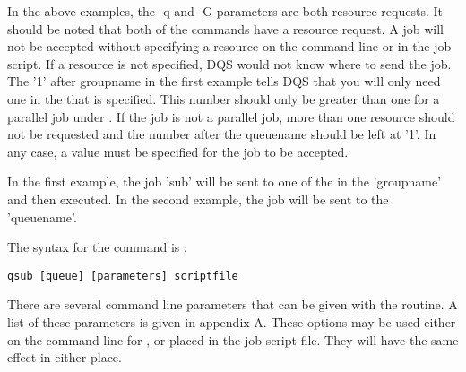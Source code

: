 In the above examples, the -q and -G parameters are both resource
requests.  It should be noted that both of the \qsub commands have a
resource request.  A job will not be accepted without specifying a resource
on the command line or in the job script.  If a resource is not specified,
DQS would not
know where to send the job.
The '1' after groupname in the first
example tells DQS that you will only need one \queue
in the \group that is specified.  This number should only be
greater than one for a parallel job under \pvm.  If the job is not a
parallel job, more than one resource should not be requested and the
number after the queuename should be left at '1'.  In any case, a value
must be specified for the job to be accepted.

In the first \qsub example, the job 'sub' will be sent to one of the
\queues in the \group 'groupname' and then executed.  In the second \qsub
example, the job will be sent to the \queue 'queuename'.

The syntax for the \qsub command is :
\begin{verbatim}
qsub [queue] [parameters] scriptfile
\end{verbatim}
There are several command line
parameters that can be given with the \qsub routine.  A list of these
parameters is given in appendix A.
These options may be used either on the command line for \qsub, or
placed in the job script file.  They will have the same effect in either
place.

